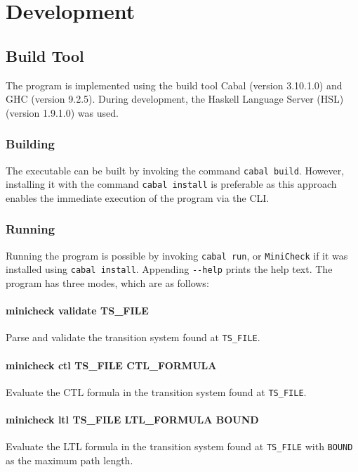 \documentclass[11pt]{article}
\begin{document}
\section{Development}

\subsection{Build Tool}

The program is implemented using the build tool Cabal (version 3.10.1.0) and GHC (version 9.2.5).
During development, the Haskell Language Server (HSL) (version 1.9.1.0) was used.

\subsubsection{Building}
The executable can be built by invoking the command \verb|cabal build|.
However, installing it with the command \verb|cabal install| is preferable as this approach enables the immediate execution of the program via the CLI.

\subsubsection{Running}

Running the program is possible by invoking \verb|cabal run|, or \verb|MiniCheck| if it was installed using \verb|cabal install|.
Appending \verb|--help| prints the help text.
The program has three modes, which are as follows:

\paragraph{minicheck validate TS\_FILE}
Parse and validate the transition system found at \verb|TS_FILE|.

\paragraph{minicheck ctl TS\_FILE CTL\_FORMULA}
Evaluate the CTL formula in the transition system found at \verb|TS_FILE|.

\paragraph{minicheck ltl TS\_FILE LTL\_FORMULA BOUND}
Evaluate the LTL formula in the transition system found at \verb|TS_FILE| with \verb|BOUND| as the maximum path length.
\end{document}
